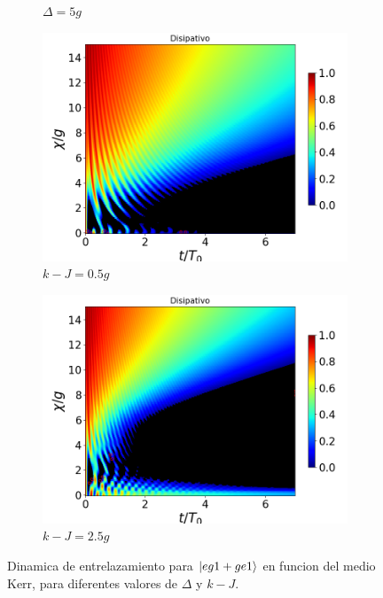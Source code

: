 \begin{figure}[h!]
\begin{subfigure}{0.49\textwidth}
        \caption{$\Delta=5g$}
        \label{fig4:concu x 1 d2}
    \end{subfigure}
    \vfill
    \begin{subfigure}{0.49\textwidth}
        \includegraphics[width=\textwidth]{figuras/ch4/concu/chi/eg1+ge1 d=0.0g k=0.5g J=0.0g gamma=0.25g concu chi dis.png}
        \caption{$k-J=0.5g$}
        \label{fig4:concu x 1 k1}
    \end{subfigure}
    \hfill
    \begin{subfigure}{0.49\textwidth}
        \includegraphics[width=\textwidth]{figuras/ch4/concu/chi/eg1+ge1 d=0.0g k=2.5g J=0.0g gamma=0.25g concu chi dis.png}
        \caption{$k-J=2.5g$}
        \label{fig4:concu x 1 k2}
    \end{subfigure}
    \caption{Dinamica de entrelazamiento para $\ket{eg1+ge1}$ en funcion del medio Kerr, para diferentes valores de $\Delta$ y $k-J$.}
    \label{fig4:concu x params 1}
\end{figure}
